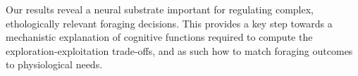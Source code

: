 \indent Our results reveal a neural substrate important for regulating complex, ethologically relevant foraging decisions. This provides a key step towards a mechanistic explanation of cognitive functions required to compute the exploration-exploitation trade-offs, and as such how to match foraging outcomes to physiological needs.
%
%
%

